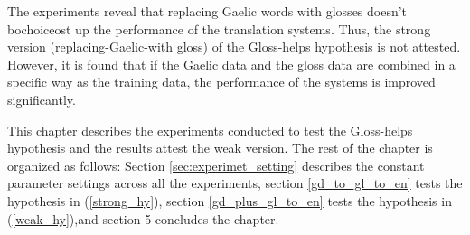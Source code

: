 \documentclass[final]{ua-thesis}
\numberwithin{equation}{section}
\begin{document}
The experiments reveal that replacing Gaelic words with glosses doesn't bochoiceost up the performance of the translation systems. Thus, the strong version (replacing-Gaelic-with gloss) of the Gloss-helps hypothesis is not attested. However, it is found that if the Gaelic data and the gloss data are combined in a specific way as the training data, the performance of the systems is improved significantly. 

This chapter describes the experiments conducted to test the Gloss-helps hypothesis and the results attest the weak version.
The rest of the chapter is organized as follows: Section \ref{sec:experimet_setting} describes the constant parameter settings across all the experiments, section \ref{gd_to_gl_to_en} tests the hypothesis in (\ref{strong_hy}), section \ref{gd_plus_gl_to_en} tests the hypothesis in (\ref{weak_hy}),and section 5 concludes the chapter. 

\end{document}
